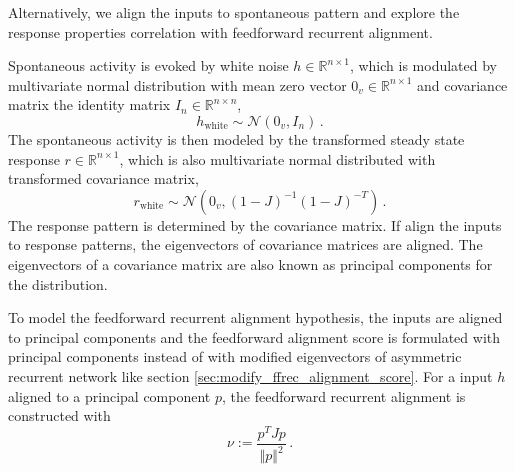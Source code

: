 \documentclass[11pt]{article}
\begin{document}
	Alternatively, we align the inputs to spontaneous pattern and explore the response properties correlation with feedforward recurrent alignment. 
		
	Spontaneous activity is evoked by white noise $h \in \mathbb{R}^{n \times 1}$, which is modulated by multivariate normal distribution with mean zero vector $0_v \in \mathbb{R}^{n \times 1}$ and covariance matrix the identity matrix $I_n \in \mathbb{R}^{n \times n}$, 
		\begin{equation}
			h_{\text{white}} \sim \mathcal{N}(0_v, I_n) \, .
		\end{equation}
	The spontaneous activity is then modeled by the transformed steady state response $r \in \mathbb{R}^{n \times 1}$, which is also multivariate normal distributed with transformed covariance matrix, 
		\begin{equation}
			r_{\text{white}} \sim \mathcal{N}\left(0_v, (1-J)^{-1}(1-J)^{-T}\right) \, .
		\end{equation}
	The response pattern is determined by the covariance matrix. If align the inputs to response patterns, the eigenvectors of covariance matrices are aligned. The eigenvectors of a covariance matrix are also known as principal components for the distribution. 
	
	To model the feedforward recurrent alignment hypothesis, the inputs are aligned to principal components and the feedforward alignment score is formulated with principal components instead of with modified eigenvectors of asymmetric recurrent network like section \ref{sec:modify_ffrec_alignment_score}. For a input $h$ aligned to a principal component $p$, the feedforward recurrent alignment is constructed with 
		\begin{equation} \label{eq:ffrec_white_noise}
			\nu := \frac{p^T J p}{\Vert p \Vert^2} \, .
		\end{equation}
	
\end{document}
